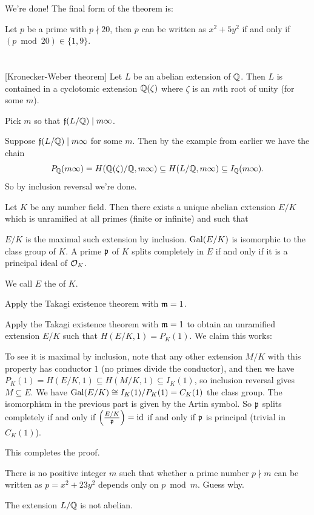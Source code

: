We're done! The final form of the theorem is:
\begin{theorem}
	Let $p$ be a prime with $p \nmid 20$, then $p$ can be written as $x^2 + 5y^2$ if and only if
	$(p \bmod 20) \in \{ 1, 9 \}$.
\end{theorem}


\section{\problemhead}
\begin{dproblem}
	\label{prob:kronecker_weber_theorem}
	[Kronecker-Weber theorem]
	Let $L$ be an abelian extension of $\mathbb Q$.
	Then $L$ is contained in a cyclotomic extension $\mathbb Q(\zeta)$
	where $\zeta$ is an $m$th root of unity (for some $m$).
	\begin{hint}
		Pick $m$ so that $\mathfrak f(L/\mathbb Q) \mid m\infty$.
	\end{hint}
	\begin{sol}
		Suppose $\mathfrak f(L/\mathbb Q) \mid m\infty$ for some $m$.
		Then by the example from earlier we have the chain
		\[ P_{\mathbb Q}(m\infty) = H(\mathbb Q(\zeta)/\mathbb Q, m\infty)
			\subseteq H(L/\mathbb Q, m\infty) \subseteq I_\mathbb Q(m\infty). \]
		So by inclusion reversal we're done.
	\end{sol}
\end{dproblem}

\begin{dproblem}
	\label{prob:hilbert_class_field}
	Let $K$ be any number field.
	Then there exists a unique abelian extension $E/K$
	which is unramified at all primes (finite or infinite)
	and such that
	\begin{itemize}
		\ii $E/K$ is the maximal such extension by inclusion.
		\ii $\operatorname{Gal}(E/K)$ is isomorphic to the class group of $K$.
		\ii A prime $\mathfrak p$ of $K$ splits completely in $E$
		if and only if it is a principal ideal of $\mathcal O_K$.
	\end{itemize}
	We call $E$ the  of $K$.
	\begin{hint}
		Apply the Takagi existence theorem with $\mathfrak m = 1$.
	\end{hint}
	\begin{sol}
		Apply the Takagi existence theorem with $\mathfrak m = 1$
		to obtain an unramified extension $E/K$ such that
		$H(E/K, 1) = P_K(1)$.
		We claim this works:
		\begin{itemize}
			\ii To see it is maximal by inclusion, note that any other extension $M/K$
			with this property has conductor $1$ (no primes divide the conductor),
			and then we have $P_K(1) = H(E/K, 1) \subseteq H(M/K, 1) \subseteq I_K(1)$,
			so inclusion reversal gives $M \subseteq E$.
			\ii We have $\operatorname{Gal}(E/K) \cong I_K(1) / P_K(1) = C_K(1)$ the class group.
			\ii The isomorphism in the previous part is given by the Artin symbol.
			So $\mathfrak p$ splits completely if and only if $\left( \frac{E/K}{\mathfrak p} \right) = \mathrm{id}$
			if and only if $\mathfrak p$ is principal (trivial in $C_K(1)$).
		\end{itemize}
		This completes the proof.
	\end{sol}
\end{dproblem}

\begin{problem}
	There is no positive integer $m$ such that whether a prime number $p \nmid m$ can be written as
	$p = x^2 + 23 y^2$ depends only on $p \bmod m$. Guess why.
	\begin{hint}
		The extension $L/\mathbb Q$ is not abelian.
	\end{hint}
\end{problem}
